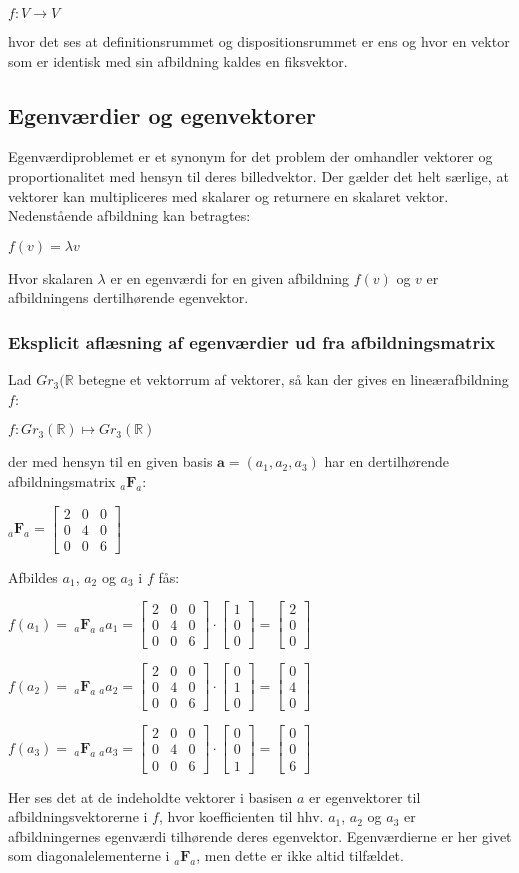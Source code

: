 \documentclass{article}
\newcommand{\cent}[1]{\begin{center}#1\end{center}}
\newcommand{\afb}[3]{\ensuremath{_#1 \textbf{#2}_#3}}
\newcommand{\vek}[3]{\ensuremath{\begin{bmatrix} #1\\ #2\\ #3\end{bmatrix}}}
\newcommand{\mediumMatrix}[9]{\ensuremath{
		\begin{bmatrix}
			#1 & #2 & #3 \\
			#4 & #5 & #6 \\
			#7 & #8 & #9
		\end{bmatrix}}}
\begin{document}
	\cent{$ f:V \rightarrow V $}
	
	hvor det ses at definitionsrummet og dispositionsrummet er ens og hvor en vektor som er identisk med sin afbildning kaldes en fiksvektor. 
	
	\subsection{Egenværdier og egenvektorer}
	
	Egenværdiproblemet er et synonym for det problem der omhandler vektorer og proportionalitet med hensyn til deres billedvektor. Der gælder det helt særlige, at vektorer kan multipliceres med skalarer og returnere en skalaret vektor. Nedenstående afbildning kan betragtes:
	
	\cent{$ f(v)=\lambda v $}
	
	Hvor skalaren $\lambda$ er en egenværdi for en given afbildning $f(v)$ og $v$ er afbildningens dertilhørende egenvektor. 
	
	\subsubsection{Eksplicit aflæsning af egenværdier ud fra afbildningsmatrix}
	
	
	Lad $Gr_3(\mathbb{R}$ betegne et vektorrum af vektorer, så kan der gives en lineærafbildning $f$:
	
	\cent{$f : Gr_3(\mathbb{R})\mapsto Gr_3(\mathbb{R})$ }
	
	der med hensyn til en given basis $\textbf{a}=(a_1,a_2,a_3)$ har en dertilhørende afbildningsmatrix \afb{a}{F}{a}:
	
	\cent{$ \afb{a}{F}{a} = \mediumMatrix{2}{0}{0}{0}{4}{0}{0}{0}{6} $}
	Afbildes $a_1$, $a_2$ og $a_3$ i $f$ fås:
	
	\cent{$ f(a_1)=\ \afb{a}{F}{a} \ _a a_1 = \mediumMatrix{2}{0}{0}{0}{4}{0}{0}{0}{6} \cdot \vek{1}{0}{0} = \vek{2}{0}{0} $}
	\cent{$ f(a_2)=\ \afb{a}{F}{a} \ _a a_2 = \mediumMatrix{2}{0}{0}{0}{4}{0}{0}{0}{6} \cdot \vek{0}{1}{0} = \vek{0}{4}{0} $}	
	\cent{$ f(a_3)=\ \afb{a}{F}{a} \ _a a_3 = \mediumMatrix{2}{0}{0}{0}{4}{0}{0}{0}{6} \cdot \vek{0}{0}{1} = \vek{0}{0}{6} $}
	
	Her ses det at de indeholdte vektorer i basisen $a$ er egenvektorer til afbildningsvektorerne i $f$, hvor koefficienten til hhv. $a_1$, $a_2$ og $a_3$ er afbildningernes egenværdi tilhørende deres egenvektor. Egenværdierne er her givet som diagonalelementerne i \afb{a}{F}{a}, men dette er ikke altid tilfældet.
	
\end{document}
